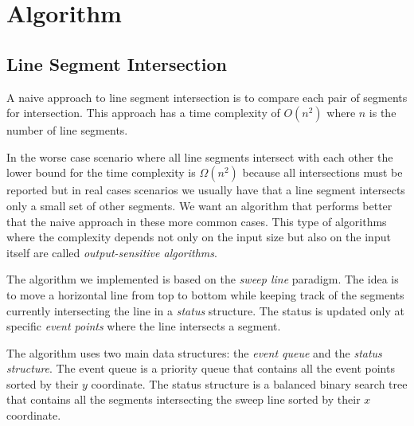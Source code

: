 \section{Algorithm}
\label{sec:algorithm}
\subsection{Line Segment Intersection}
\label{sec:line_segment_intersection}
A naive approach to line segment intersection is to compare each pair of segments for intersection. This approach has a time complexity of $O(n^2)$ where $n$ is the number of line segments.

In the worse case scenario where all line segments intersect with each other the lower bound for the time complexity is $\Omega(n^2)$ because all intersections must be reported but in real cases scenarios we usually have that a line segment intersects only a small set of other segments. We want an algorithm that performs better that the naive approach in these more common cases. This type of algorithms where the complexity depends not only on the input size but also on the input itself are called \textit{output-sensitive algorithms}.

The algorithm we implemented is based on the \textit{sweep line} paradigm. The idea is to move a horizontal line from top to bottom while keeping track of the segments currently intersecting the line in a \textit{status} structure. The status is updated only at specific \textit{event points} where the line intersects a segment.

The algorithm uses two main data structures: the \textit{event queue} and the \textit{status structure}. The event queue is a priority queue that contains all the event points sorted by their $y$ coordinate. The status structure is a balanced binary search tree that contains all the segments intersecting the sweep line sorted by their $x$ coordinate.

